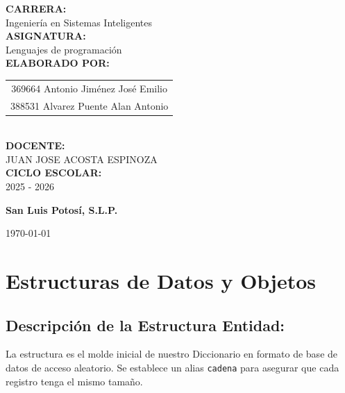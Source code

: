 \documentclass[12pt]{article}
\begin{document}
\begin{titlepage}
    \begin{minipage}{0.9\textwidth}
        \centering
        \textbf{\color{MainBlue} CARRERA:} \\
        Ingeniería en Sistemas Inteligentes \\ [0.5cm]
        \textbf{\color{MainBlue} ASIGNATURA:} \\
        Lenguajes de programación \\ [0.5cm]
        \textbf{\color{MainBlue} ELABORADO POR:} \\
        \begin{tabular}{c}
            369664 Antonio Jiménez José Emilio \\
            388531 Alvarez Puente Alan Antonio
        \end{tabular} \\ [0.5cm]
        \textbf{\color{MainBlue} DOCENTE:} \\
            JUAN JOSE ACOSTA ESPINOZA \\[0.5cm] %
        \textbf{\color{MainBlue} CICLO ESCOLAR:} \\
        2025 - 2026
    \end{minipage}

    \vfill
    {\large \bfseries \color{MainBlue} San Luis Potosí, S.L.P. \par}
    {\color{gray} \today}
\end{titlepage}

\newpage
\pagestyle{fancy}
\fancyhf{}
\fancyfoot[C]{\thepage}
\renewcommand{\headrulewidth}{0.4pt}

\tableofcontents
\newpage

\section{Estructuras de Datos y Objetos}

{}
\subsection*{Descripción de la Estructura Entidad:}

La estructura es el molde inicial de nuestro Diccionario en formato de base de datos de acceso aleatorio. Se establece un alias \texttt{cadena} para asegurar que cada registro tenga el mismo tamaño.
\end{document}
